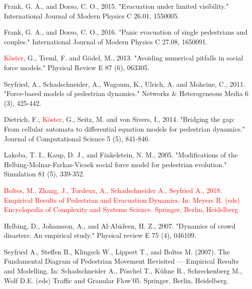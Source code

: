 \documentclass[preprint,12pt]{elsarticle}
\begin{document}
\begin{thebibliography}{10}
Frank, G. A., and Dorso, C. O., 2015. "Evacuation under limited 
visibility." International Journal of Modern Physics C 26.01, 1550005.
{}

Frank, G. A., and Dorso, C. O., 2016. "Panic evacuation of single pedestrians 
and couples." International Journal of Modern Physics C 27.08, 1650091. 
{}

\textcolor{red}{K\"oster}, G., Treml, F. and G\"odel, M., 2013. "Avoiding 
numerical pitfalls in social force models." Physical Review E 87 (6), 063305.
{}

Seyfried, A., Schadschneider, A., Wagoum, K., Ulrich, A. and Mohcine, C., 
2011. "Force-based models of pedestrian dynamics." Networks 
\& Heterogeneous Media 6 (3), 425-442.
{}

Dietrich, F., \textcolor{red}{K\"oster}, G., Seitz, M. and 
von Sivers, I., 2014. "Bridging the gap: From cellular automata to 
differential equation models for pedestrian dynamics." Journal of Computational 
Science 5 (5), 841-846.{}

Lakoba, T. I., Kaup, D. J., and Finkelstein, N. M., 2005. "Modifications of the 
Helbing-Molnar-Farkas-Vicsek social force model for pedestrian evolution." 
Simulation 81 (5), 339-352.
{}

\textcolor{red}{Boltes, M., Zhang, J., Tordeux, A., Schadschneider A., Seyfried 
A., 
2018. Empirical Results of Pedestrian and Evacuation Dynamics. In: Meyers R. 
(eds) Encyclopedia of Complexity and Systems Science. Springer, Berlin, 
Heidelberg}

Helbing, D., Johansson, A., and Al-Abideen, H. Z., 2007. "Dynamics of crowd 
disasters: An empirical study." Physical review E 75 (4), 046109.
{}

Seyfried A., Steffen B., Klingsch W., Lippert T., and Boltes M. (2007). The 
Fundamental Diagram of Pedestrian Movement Revisited — Empirical Results and 
Modelling. In: Schadschneider A., P\"oschel T., K\"uhne R., Schreckenberg M., 
Wolf D.E. (eds) Traffic and Granular Flow’05. Springer, Berlin, Heidelberg.


\end{thebibliography}
\end{document}

